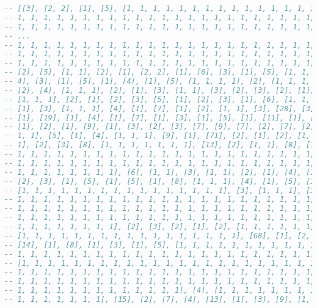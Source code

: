 \documentclass[gap.tex]{subfiles}
\begin{document}
\begin{lstlisting}[language=Haskell, caption={Lists of runs.}]
-- [[3], [2, 2], [1], [5], [1, 1, 1, 1, 1, 1, 1, 1, 1, 1, 1, 1, 1, 1, 1, 1, 1,
-- 1, 1, 1, 1, 1, 1, 1, 1, 1, 1, 1, 1, 1, 1, 1, 1, 1, 1, 1, 1, 1, 1, 1, 1, 1,
-- 1, 1, 1, 1, 1, 1, 1, 1, 1, 1, 1, 1, 1, 1, 1, 1, 1, 1, 1, 1, 1, 1, 1, 1, 1,
-- ...
-- 1, 1, 1, 1, 1, 1, 1, 1, 1, 1, 1, 1, 1, 1, 1, 1, 1, 1, 1, 1, 1, 1, 1, 1, 1,
-- 1, 1, 1, 1, 1, 1, 1, 1, 1, 1, 1, 1, 1, 1, 1, 1, 1, 1, 1, 1, 1, 1, 1, 1, 1,
-- 1, 1, 1, 1, 1, 1, 1, 1, 1, 1, 1, 1, 1, 1, 1, 1, 1, 1, 1, 1, 1, 1, 1, 1, 1],
-- [2], [5], [1, 1], [2], [1], [2, 2], [1], [6], [3], [1], [5], [1, 1, 1], [4,
-- 4], [3], [1], [5], [1], [4], [1], [5], [1, 1, 1, 1], [2], [1, 1, 1, 1, 1],
-- [2], [4], [1, 1, 1], [2], [1], [3], [1, 1], [3], [2], [3], [2], [1], [2],
-- [1, 1, 1], [2], [1], [2], [3], [5], [1], [2], [3], [1], [6], [1, 1, 1], [5],
-- [1], [3], [1, 1, 1], [4], [1], [7], [1], [2], [1, 1], [3], [28], [3], [5],
-- [1], [19], [1], [4], [1], [7], [1], [3], [1], [5], [1], [11], [1], [10],
-- [1], [2], [1], [9], [1], [3], [2], [3], [7], [9], [7], [2], [7], [2], [1, 1,
-- 1, 1], [5], [1], [4], [1, 1, 1], [9], [1], [71], [2], [1], [2], [1, 1, 1,
-- 1], [2], [3], [8], [1, 1, 1, 1, 1, 1, 1], [13], [2], [1, 1], [8], [1, 1, 1,
-- 1, 1, 1, 1, 1, 1, 1, 1, 1, 1, 1, 1, 1, 1, 1, 1, 1, 1, 1, 1, 1, 1, 1, 1, 1,
-- 1, 1, 1, 1, 1, 1, 1, 1, 1, 1, 1, 1, 1, 1, 1, 1, 1, 1, 1, 1, 1, 1, 1, 1, 1,
-- 1, 1, 1, 1, 1, 1, 1, 1], [6], [1, 1], [3], [1, 1], [2], [1], [4], [1], [3],
-- [2], [3], [1], [5], [1], [5], [1], [8], [1, 1, 1], [4], [1], [5], [1], [7],
-- [1, 1, 1, 1, 1, 1, 1, 1, 1, 1, 1, 1, 1, 1, 1, 1], [3], [1, 1, 1], [3], [1,
-- 1, 1, 1, 1, 1, 1, 1, 1, 1, 1, 1, 1, 1, 1, 1, 1, 1, 1, 1, 1, 1, 1, 1, 1, 1,
-- 1, 1, 1, 1, 1, 1, 1, 1, 1, 1, 1, 1, 1, 1, 1, 1, 1, 1, 1, 1, 1, 1, 1, 1, 1,
-- 1, 1, 1, 1, 1, 1, 1, 1, 1, 1, 1, 1, 1, 1, 1, 1, 1, 1, 1, 1, 1, 1, 1, 1, 1,
-- 1, 1, 1, 1, 1, 1, 1, 1], [2], [3], [2], [1], [2], [1, 1, 1, 1, 1, 1], [2],
-- [1, 1, 1, 1, 1, 1, 1, 1, 1, 1, 1, 1, 1, 1, 1, 1, 1], [68], [1], [2, 2],
-- [14], [1], [8], [1], [3], [1], [5], [1, 1, 1, 1, 1, 1, 1, 1, 1, 1, 1, 1, 1,
-- 1, 1, 1, 1, 1, 1, 1, 1, 1, 1, 1, 1, 1, 1, 1, 1, 1, 1, 1, 1, 1, 1, 1], [18],
-- [1, 1, 1, 1, 1, 1, 1, 1, 1, 1, 1, 1, 1, 1, 1, 1, 1, 1, 1, 1, 1, 1, 1, 1, 1,
-- 1, 1, 1, 1, 1, 1, 1, 1, 1, 1, 1, 1, 1, 1, 1, 1, 1, 1, 1, 1, 1, 1, 1, 1, 1,
-- 1, 1, 1, 1, 1, 1, 1, 1, 1, 1, 1, 1, 1, 1, 1, 1, 1, 1, 1, 1, 1, 1, 1, 1, 1,
-- 1, 1, 1, 1, 1, 1, 1, 1, 1, 1, 1, 1, 1], [4], [1, 1, 1, 1, 1, 1, 1, 1, 1, 1,
-- 1, 1, 1, 1, 1, 1, 1], [15], [2], [7], [4], [13], [1], [3], [9], [1, 1, 1, 1,

\end{lstlisting}
\end{document}
